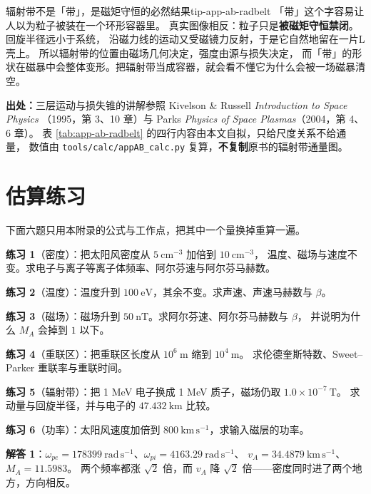 \begin{tip}{辐射带不是「带」，是磁矩守恒的必然结果}{tip-app-ab-radbelt}
「带」这个字容易让人以为粒子被装在一个环形容器里。
真实图像相反：粒子只是\textbf{被磁矩守恒禁闭}。回旋半径远小于系统，
沿磁力线的运动又受磁镜力反射，于是它自然地留在一片L壳上。
所以辐射带的位置由磁场几何决定，强度由源与损失决定，
而「带」的形状在磁暴中会整体变形。把辐射带当成容器，就会看不懂它为什么会被一场磁暴清空。
\end{tip}

{\footnotesize
\textbf{出处：}三层运动与损失锥的讲解参照 Kivelson \& Russell \emph{Introduction to Space Physics}
（1995，第 3、10 章）与 Parks \emph{Physics of Space Plasmas}（2004，第 4、6 章）。
表 \ref{tab:app-ab-radbelt} 的四行内容由本文自拟，只给尺度关系不给通量，
数值由 \texttt{tools/\allowbreak{}calc/\allowbreak{}appAB\_calc.py} 复算，\textbf{不复制}原书的辐射带通量图。
}

\section{估算练习}
\label{sec:app-ab-problems}

下面六题只用本附录的公式与工作点，把其中一个量换掉重算一遍。

\textbf{练习 1}（密度）：把太阳风密度从 $5\ \mathrm{cm^{-3}}$ 加倍到 $10\ \mathrm{cm^{-3}}$，
温度、磁场与速度不变。求电子与离子等离子体频率、阿尔芬速与阿尔芬马赫数。

\textbf{练习 2}（温度）：温度升到 $100\ \mathrm{eV}$，其余不变。求声速、声速马赫数与 $\beta$。

\textbf{练习 3}（磁场）：磁场升到 $50\ \mathrm{nT}$。求阿尔芬速、阿尔芬马赫数与 $\beta$，
并说明为什么 $M_A$ 会掉到 $1$ 以下。

\textbf{练习 4}（重联区）：把重联区长度从 $10^{6}\ \mathrm{m}$ 缩到 $10^{4}\ \mathrm{m}$。
求伦德奎斯特数、Sweet--Parker 重联率与重联时间。

\textbf{练习 5}（辐射带）：把 1 MeV 电子换成 1 MeV 质子，磁场仍取 $1.0\times10^{-7}\ \mathrm{T}$。
求动量与回旋半径，并与电子的 $47.432\ \mathrm{km}$ 比较。

\textbf{练习 6}（功率）：太阳风速度加倍到 $800\ \mathrm{km\,s^{-1}}$，求输入磁层的功率。

\textbf{解答 1}：$\omega_{pe}=178399\ \mathrm{rad\,s^{-1}}$、$\omega_{pi}=4163.29\ \mathrm{rad\,s^{-1}}$、
$v_A=34.4879\ \mathrm{km\,s^{-1}}$、$M_A=11.5983$。
两个频率都涨 $\sqrt{2}$ 倍，而 $v_A$ 降 $\sqrt{2}$ 倍——密度同时进了两个地方，方向相反。

